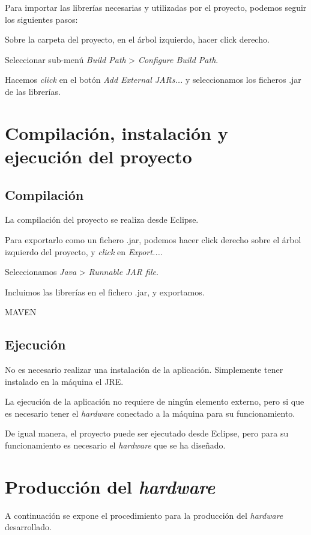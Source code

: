 Para importar las librerías necesarias y utilizadas por el proyecto, podemos seguir los siguientes pasos:

Sobre la carpeta del proyecto, en el árbol izquierdo, hacer click derecho.

Seleccionar sub-menú \emph{Build Path} > \emph{Configure Build Path}.

Hacemos \emph{click} en el botón \emph{Add External JARs...} y seleccionamos los ficheros .jar de las librerías.


\section{Compilación, instalación y ejecución del proyecto}


\subsection{Compilación}
La compilación del proyecto se realiza desde Eclipse. 

Para exportarlo como un fichero .jar, podemos hacer click derecho sobre el árbol izquierdo del proyecto, y \emph{click} en \emph{Export...}.

Seleccionamos \emph{Java} > \emph{Runnable JAR file}.

Incluimos las librerías en el fichero .jar, y exportamos.

MAVEN

\subsection{Ejecución}

No es necesario realizar una instalación de la aplicación. Simplemente tener instalado en la máquina el JRE.

La ejecución de la aplicación no requiere de ningún elemento externo, pero si que es necesario tener el \emph{hardware} conectado a la máquina para su funcionamiento.

De igual manera, el proyecto puede ser ejecutado desde Eclipse, pero para su funcionamiento es necesario el \emph{hardware} que se ha diseñado.

\section{Producción del \emph{hardware}}

A continuación se expone el procedimiento para la producción del \emph{hardware} desarrollado.

